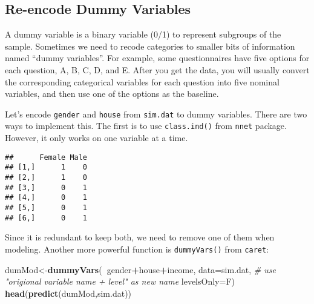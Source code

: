 \documentclass[
]{article}
\newenvironment{Shaded}{\begin{snugshade}}{\end{snugshade}}
\newcommand{\CommentTok}[1]{\textcolor[rgb]{0.56,0.35,0.01}{\textit{#1}}}
\newcommand{\DataTypeTok}[1]{\textcolor[rgb]{0.13,0.29,0.53}{#1}}
\newcommand{\KeywordTok}[1]{\textcolor[rgb]{0.13,0.29,0.53}{\textbf{#1}}}
\newcommand{\NormalTok}[1]{#1}
\newcommand{\OperatorTok}[1]{\textcolor[rgb]{0.81,0.36,0.00}{\textbf{#1}}}
\begin{document}
\hypertarget{re-encode-dummy-variables}{%
\subsection{Re-encode Dummy Variables}\label{re-encode-dummy-variables}}

A dummy variable is a binary variable (0/1) to represent subgroups of
the sample. Sometimes we need to recode categories to smaller bits of
information named ``dummy variables''. For example, some questionnaires
have five options for each question, A, B, C, D, and E. After you get
the data, you will usually convert the corresponding categorical
variables for each question into five nominal variables, and then use
one of the options as the baseline.

Let's encode \texttt{gender} and \texttt{house} from \texttt{sim.dat} to
dummy variables. There are two ways to implement this. The first is to
use \texttt{class.ind()} from \texttt{nnet} package. However, it only
works on one variable at a time.

\begin{Shaded}
\end{Shaded}

\begin{verbatim}
##      Female Male
## [1,]      1    0
## [2,]      1    0
## [3,]      0    1
## [4,]      0    1
## [5,]      0    1
## [6,]      0    1
\end{verbatim}

Since it is redundant to keep both, we need to remove one of them when
modeling. Another more powerful function is \texttt{dummyVars()} from
\texttt{caret}:

\begin{Shaded}
\begin{Highlighting}[]
\NormalTok{dumMod<-}\KeywordTok{dummyVars}\NormalTok{(}\OperatorTok{~}\NormalTok{gender}\OperatorTok{+}\NormalTok{house}\OperatorTok{+}\NormalTok{income,}
                  \DataTypeTok{data=}\NormalTok{sim.dat,}
                  \CommentTok{# use "origional variable name + level" as new name}
                  \DataTypeTok{levelsOnly=}\NormalTok{F)}
\KeywordTok{head}\NormalTok{(}\KeywordTok{predict}\NormalTok{(dumMod,sim.dat))}
\end{Highlighting}
\end{Shaded}
\end{document}
